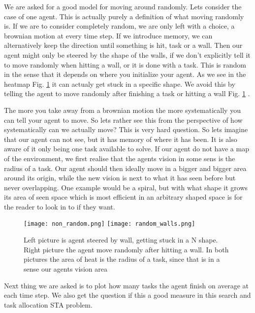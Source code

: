 \documentclass[a4paper]{article}
\begin{document}
We are asked for a good model for moving around randomly. Lets consider the case of one agent. This is actually purely a definition of what moving randomly is. If we are to consider completely random, we are only left with a choice, a brownian motion at every time step. If we introduce memory, we can alternatively keep the direction until something is hit, task or a wall. Then our agent might only be steered by the shape of the walls, if we don't explicitly tell it to move randomly when hitting a wall, or it is done with a task. This is random in the sense that it depends on where you initialize your agent. As we see in the heatmap Fig. \ref{random_walls} it can actualy get stuck in a specific shape. We avoid this by telling the agent to move randomly after finishing a task or hitting a wall Fig. \ref{random_walls} .


The more you take away from a brownian motion the more systematically you can tell your agent to move. So lets rather see this from the perspective of how systematically can we actually move? This is very hard question. So lets imagine that our agent can not see, but it has memory of where it has been. It is also aware of it only being one task available to solve. If our agent do not have a map of the environment, we first realise that the agents vision in some sens is the radius of a task. Our agent should then ideally move in a bigger and bigger area around its origin, while the new vision is next to what it has seen before but never overlapping. One example would be a spiral, but with what shape it grows its area of seen space which is most efficient in an arbitrary shaped space is for the reader to look in to if they want.


\begin{figure}[H]
  \centering
  \texttt{[image: non\_random.png]}
   \label{non_random}
  \centering
  \texttt{[image: random\_walls.png]}
  \caption{Left picture is agent steered by wall, getting stuck in a N shape. Right picture the agent move randomly after hitting a wall. In both pictures the area of heat is the radius of a task, since that is in a sense our agents vision area}
  \label{random_walls}
\end{figure}




Next thing we are asked is to plot how many tasks the agent finish on average at each time step. We also get the question if this a good measure in this search and task allocation STA problem. 
\end{document}
